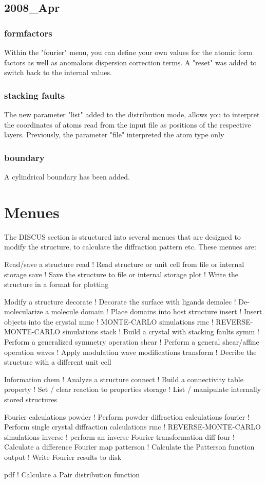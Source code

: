 \subsection*{2008\_Apr}
\subsubsection{formfactors}
Within the "fourier" menu, you can define your own values for 
the atomic form factors as well as anomalous dispersion correction 
terms. A "reset" was added to switch back to the internal values. 
\subsubsection{stacking faults}
\par
The new parameter "list" added to the distribution mode, allows 
you to interpret the coordinates of atoms read from the input 
file as positions of the respective layers. 
Previously, the parameter "file" interpreted the atom type only 
\subsubsection{boundary}
\par
A cylindrical boundary has been added. 
\section{Menues}
\par
The DISCUS section is structured into several menues that 
are designed to modify the structure, to calculate the 
diffraction pattern etc. 
These menues are: 
\par
Read/save a structure 
read       ! Read structure or unit cell from file or internal storage 
save       ! Save the structure to file or internal storage 
plot       ! Write the structure in a format for plotting 
\par
Modify a structure 
decorate   ! Decorate the surface with ligands 
demolec    ! De-molecularize a molecule 
domain     ! Place domains into host structure 
insert     ! Insert objects into the crystal 
mmc        ! MONTE-CARLO simulations 
rmc        ! REVERSE-MONTE-CARLO simulations 
stack      ! Build a crystal with stacking faults 
symm       ! Perform a generalized symmetry operation 
shear      ! Perform a general shear/affine operation 
waves      ! Apply modulation wave modifications 
transform  ! Decribe the structure with a different unit cell 
\par
Information 
chem       ! Analyze a structure 
connect    ! Build a connectivity table 
property   ! Set / clear reaction to properties 
storage    ! List / manipulate internally stored structures 
\par
Fourier calculations 
powder     ! Perform powder diffraction calculations 
fourier    ! Perform single crystal diffraction calculations 
rmc        ! REVERSE-MONTE-CARLO simulations 
inverse    ! perform an inverse Fourier transformation 
diff-four  ! Calculate a difference Fourier map 
patterson  ! Calculate the Patterson function 
output     ! Write Fourier results to disk 
\par
pdf        ! Calculate a Pair distribution function 
